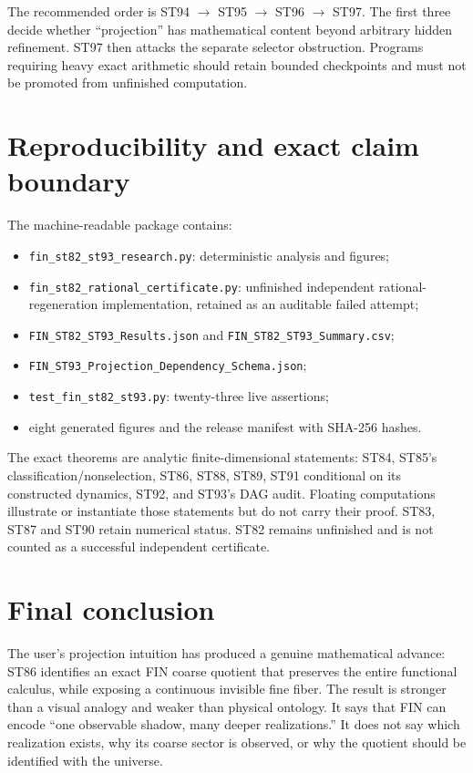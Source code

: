 \documentclass[11pt,a4paper]{article}
\begin{document}
The recommended order is ST94 $\to$ ST95 $\to$ ST96 $\to$ ST97. The first three decide whether ``projection'' has mathematical content beyond arbitrary hidden refinement. ST97 then attacks the separate selector obstruction. Programs requiring heavy exact arithmetic should retain bounded checkpoints and must not be promoted from unfinished computation.

\section{Reproducibility and exact claim boundary}

The machine-readable package contains:
\begin{itemize}
\item \texttt{fin\_st82\_st93\_research.py}: deterministic analysis and figures;
\item \texttt{fin\_st82\_rational\_certificate.py}: unfinished independent rational-regeneration implementation, retained as an auditable failed attempt;
\item \texttt{FIN\_ST82\_ST93\_Results.json} and \texttt{FIN\_ST82\_ST93\_Summary.csv};
\item \texttt{FIN\_ST93\_Projection\_Dependency\_Schema.json};
\item \texttt{test\_fin\_st82\_st93.py}: twenty-three live assertions;
\item eight generated figures and the release manifest with SHA-256 hashes.
\end{itemize}

The exact theorems are analytic finite-dimensional statements: ST84, ST85's classification/nonselection, ST86, ST88, ST89, ST91 conditional on its constructed dynamics, ST92, and ST93's DAG audit. Floating computations illustrate or instantiate those statements but do not carry their proof. ST83, ST87 and ST90 retain numerical status. ST82 remains unfinished and is not counted as a successful independent certificate.

\section{Final conclusion}

The user's projection intuition has produced a genuine mathematical advance: ST86 identifies an exact FIN coarse quotient that preserves the entire functional calculus, while exposing a continuous invisible fine fiber. The result is stronger than a visual analogy and weaker than physical ontology. It says that FIN can encode ``one observable shadow, many deeper realizations.'' It does not say which realization exists, why its coarse sector is observed, or why the quotient should be identified with the universe.
\end{document}
